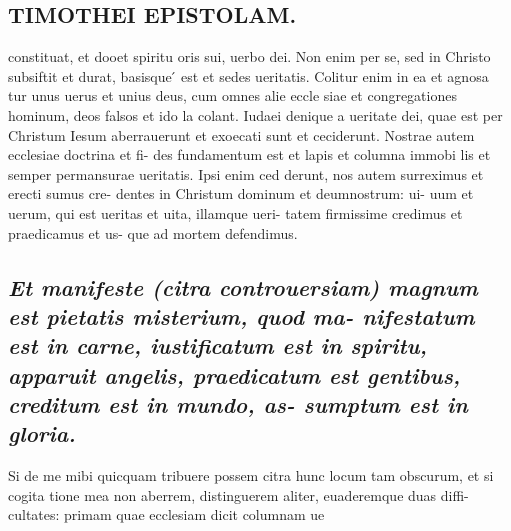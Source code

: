 \documentclass{article}
\begin{document}
\begin{pages}
\section*{TIMOTHEI EPISTOLAM. }
\marginpar{[ p.89 ]}\pstart constituat, et dooet spiritu oris sui, uerbo dei. Non enim per se, sed in Christo subsiftit et durat, basisque ́ est et sedes ueritatis. Colitur enim in ea et agnosa tur unus uerus et unius deus, cum omnes alie eccle siae et congregationes hominum, deos falsos et ido la colant. Iudaei denique a ueritate dei, quae est per Christum Iesum aberrauerunt et exoecati sunt et ceciderunt. Nostrae autem ecclesiae doctrina et fi- des fundamentum est et lapis et columna immobi lis et semper permansurae ueritatis. Ipsi enim ced derunt, nos autem surreximus et erecti sumus cre- dentes in Christum dominum et deumnostrum: ui- uum et uerum, qui est ueritas et uita, illamque ueri- tatem firmissime credimus et praedicamus et us- que ad mortem defendimus.  \pend
{}
{}
\subsection*{\textit{Et manifeste (citra controuersiam) magnum est pietatis misterium, quod ma- nifestatum est in carne, iustificatum est in spiritu, apparuit angelis, praedicatum est gentibus, creditum est in mundo, as- sumptum est in gloria. }}\pstart Si de me mibi quicquam tribuere possem citra hunc locum tam obscurum, et si cogita tione mea non aberrem, distinguerem aliter, euaderemque duas diffi- cultates: primam quae ecclesiam dicit columnam ue  \pend

\end{pages}
\end{document}
